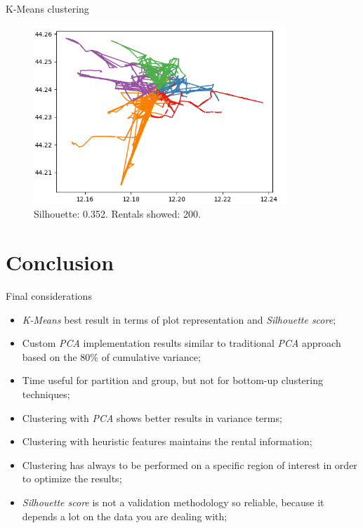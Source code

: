 \documentclass{beamer}
\begin{document}
\begin{frame}{K-Means clustering}
\begin{figure}[bt]
	\centering
	\includegraphics[width=0.85\textwidth]{k-means-plot}
	\caption{Silhouette: 0.352. Rentals showed: 200.}
	\label{fig:k-means-line}
\end{figure}
\end{frame}

\section{Conclusion}
\begin{frame}{Final considerations}
\begin{itemize}
	\item \textit{K-Means} best result in terms of plot representation and \textit{Silhouette score};
	\item Custom \textit{PCA} implementation results similar to traditional \textit{PCA} approach based on the $80\%$ of cumulative variance;
	\item Time useful for partition and group, but not for bottom-up clustering techniques;
	\item Clustering with \textit{PCA} shows better results in variance terms;
	\item Clustering with heuristic features maintains the rental information;
	\item Clustering has always to be performed on a specific region of interest in order to optimize the results;
	\item \textit{Silhouette score} is not a validation methodology so reliable, because it depends a lot on the data you are dealing with;
\end{itemize}
\end{frame}
\end{document}
